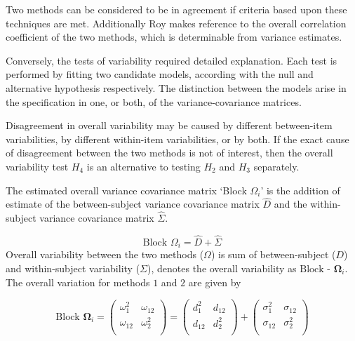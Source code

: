 \documentclass[12pt, a4paper]{report}
\theoremstyle{plain}
\theoremstyle{definition}
\theoremstyle{remark}
\begin{document}
Two methods can be considered to be in agreement if criteria based upon these techniques are met. Additionally Roy makes reference to the overall correlation coefficient of the two methods, which is determinable from variance estimates.

Conversely, the tests of variability required detailed explanation. Each test is performed by fitting two candidate models, according with the null and alternative hypothesis respectively. The distinction between the models arise in the specification in one, or both, of the variance-covariance matrices. %
	
	
	
	Disagreement in overall variability may be caused by different between-item variabilities, by different within-item variabilities, or by both.  If the exact cause of disagreement between the two methods is not of interest, then the overall variability test $H_4$ is an alternative to testing $H_2$ and $H_3$ separately.
	
	The estimated overall variance covariance matrix `Block
	$\Omega_{i}$' is the addition of estimate of the between-subject variance covariance matrix $\hat{D}$ and the within-subject variance covariance matrix $\hat{\Sigma}$.
	
	\begin{equation}
	\mbox{Block  }\Omega_{i} = \hat{D} + \hat{\Sigma}
	\end{equation}
	Overall variability between the two methods ($\Omega$) is sum of between-subject ($D$) and within-subject variability ($\Sigma$),
	\citet{ARoy2009} denotes the overall variability	as ${\mbox{Block - }\boldsymbol \Omega_{i}}$. The overall variation for methods $1$ and $2$ are given by
	
	\begin{center}
		\[\mbox{Block } \boldsymbol{\Omega}_i = \left(\begin{array}{cc}
		\omega^2_1  & \omega_{12} \\
		\omega_{12} & \omega^2_2 \\
		\end{array}  \right)
		=  \left(
		\begin{array}{cc}
		d^2_1  & d_{12} \\
		d_{12} & d^2_2 \\
		\end{array} \right)+
		\left(
		\begin{array}{cc}
		\sigma^2_1  & \sigma_{12} \\
		\sigma_{12} & \sigma^2_2 \\
		\end{array}\right)
		\]
	\end{center}
	
\end{document}
